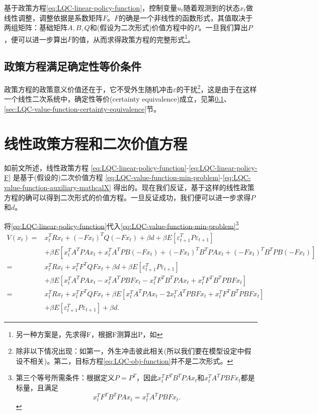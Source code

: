 基于政策方程\eqref{eq:LQC-linear-policy-function}，控制变量$u_t$随着观测到的状态$x_t$做线性调整，调整依据是系数矩阵$F$。$F$的确是一个非线性的函数形式，其值取决于两组矩阵：基础矩阵$A, B, Q$和(假设为二次形式)价值方程中的$P$。一旦我们算出$P$，便可以进一步算出$F$的值，从而求得政策方程的完整形式\footnote{另一种方案是，先求得F，根据F测算出P，如\cite[Ch.2]{Hansen:2004va}}。

\subsection{政策方程满足确定性等价条件}
\label{sec:LQC-policy-function-certainty-equivalence}
政策方程的政策意义价值还在于，它不受外生随机冲击$\varepsilon$的干扰\footnote{除非以下情况出现：如第一，外生冲击彼此相关(所以我们要在模型设定中假设不相关)。第二，目标方程\eqref{eq:LQC-obj-function}并不是二次形式。}，这是由于在这样一个线性二次系统中，确定性等价(certainty equivalence)成立，见第\ref{sec:LQC-policy-function-certainty-equivalence}、\ref{sec:LQC-value-function-certainty-equivalence}节。

\section{线性政策方程和二次价值方程}
\label{sec:LQC-lin-policy-quad-value-impli}
如前文所述，线性政策方程
\eqref{eq:LQC-linear-policy-function}-\eqref{eq:LQC-linear-policy-F}
是基于(假设的)二次价值方程
\eqref{eq:LQC-value-function-min-problem}-\eqref{eq:LQC-value-function-auxiliary-mathcalX}
得出的。现在我们反证，基于这样的线性政策方程的确可以得到二次形式的价值方程。一旦反证成功，我们便可以进一步求得$P$和$d$。

将\eqref{eq:LQC-linear-policy-function}代入\eqref{eq:LQC-value-function-min-problem}\footnote{第三个等号所需条件：根据定义$P=P^T$，因此$x_t^T F^T B^T P A x_t$和$x_t^T A^T P B F x_t$都是标量，且满足\begin{equation*}
x_t^T F^T B^T P A x_t = x_t^T A^T P B F x_t.
\end{equation*}}
\begin{align}
  \label{eq:LQC-value-function-min-expand}
  V(x_t) =& x_t^T R x_t + \left(-F x_t\right)^T Q \left(-F x_t\right) + \beta d  + \beta E[\varepsilon_{t+1}^T P \varepsilon_{t+1}] \nonumber \\
  &+\beta E \left[
  x_t^T A^T P A x_t + x_t^T A^T P B \left(-F x_t\right) + \left(-F x_t\right)^T B^T P A x_t + \left(-F x_t\right)^T B^T P B \left(-F x_t\right) \right] \nonumber \\
  =& x_t^T R x_t + x_t^T F^T Q F x_t + \beta d  + \beta E[\varepsilon_{t+1}^T P \varepsilon_{t+1}] \nonumber \\
  &+ \beta E\left[
  x_t^T A^T P A x_t - x_t^T A^T P B F x_t - x_t^T F^T B^T P A x_t + x_t^T F^T B^T P B F x_t \right] \nonumber \\
  =& x_t^T R x_t + x_t^T F^T Q F x_t + \beta E \left[
  x_t^T A^T P A x_t - 2 x_t^T A^T P B F x_t + x_t^T F^T B^T P B F x_t \right] \nonumber \\
  &+ \beta E[\varepsilon_{t+1}^T P \varepsilon_{t+1}] + \beta d.
\end{align}


